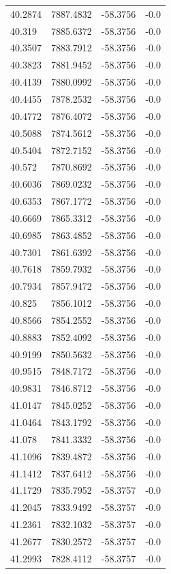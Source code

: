 \begin{table}[H]
\begin{tabular}{llll}
40.2874 & 7887.4832 & -58.3756 & -0.0 \\
40.319 & 7885.6372 & -58.3756 & -0.0 \\
40.3507 & 7883.7912 & -58.3756 & -0.0 \\
40.3823 & 7881.9452 & -58.3756 & -0.0 \\
40.4139 & 7880.0992 & -58.3756 & -0.0 \\
40.4455 & 7878.2532 & -58.3756 & -0.0 \\
40.4772 & 7876.4072 & -58.3756 & -0.0 \\
40.5088 & 7874.5612 & -58.3756 & -0.0 \\
40.5404 & 7872.7152 & -58.3756 & -0.0 \\
40.572 & 7870.8692 & -58.3756 & -0.0 \\
40.6036 & 7869.0232 & -58.3756 & -0.0 \\
40.6353 & 7867.1772 & -58.3756 & -0.0 \\
40.6669 & 7865.3312 & -58.3756 & -0.0 \\
40.6985 & 7863.4852 & -58.3756 & -0.0 \\
40.7301 & 7861.6392 & -58.3756 & -0.0 \\
40.7618 & 7859.7932 & -58.3756 & -0.0 \\
40.7934 & 7857.9472 & -58.3756 & -0.0 \\
40.825 & 7856.1012 & -58.3756 & -0.0 \\
40.8566 & 7854.2552 & -58.3756 & -0.0 \\
40.8883 & 7852.4092 & -58.3756 & -0.0 \\
40.9199 & 7850.5632 & -58.3756 & -0.0 \\
40.9515 & 7848.7172 & -58.3756 & -0.0 \\
40.9831 & 7846.8712 & -58.3756 & -0.0 \\
41.0147 & 7845.0252 & -58.3756 & -0.0 \\
41.0464 & 7843.1792 & -58.3756 & -0.0 \\
41.078 & 7841.3332 & -58.3756 & -0.0 \\
41.1096 & 7839.4872 & -58.3756 & -0.0 \\
41.1412 & 7837.6412 & -58.3756 & -0.0 \\
41.1729 & 7835.7952 & -58.3757 & -0.0 \\
41.2045 & 7833.9492 & -58.3757 & -0.0 \\
41.2361 & 7832.1032 & -58.3757 & -0.0 \\
41.2677 & 7830.2572 & -58.3757 & -0.0 \\
41.2993 & 7828.4112 & -58.3757 & -0.0 \\

\end{tabular}
\end{table}

